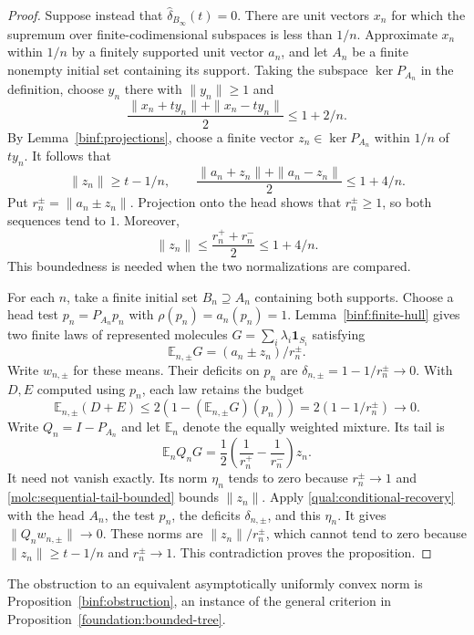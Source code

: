\begin{proof}
Suppose instead that $\widehat\delta_{B_\infty}(t)=0$. There are unit vectors $x_n$
for which the supremum over finite-codimensional subspaces is less than
$1/n$. Approximate $x_n$ within $1/n$ by a finitely supported unit vector
$a_n$, and let $A_n$ be a finite nonempty initial set containing its
support. Taking the subspace $\ker P_{A_n}$ in the definition, choose
$y_n$ there with $\|y_n\|\ge1$ and
\[
 \frac{\|x_n+ty_n\|+\|x_n-ty_n\|}{2}\le1+2/n.
\]
By Lemma~\ref{binf:projections}, choose a finite vector
$z_n\in\ker P_{A_n}$ within $1/n$ of $ty_n$. It follows that
\[
 \|z_n\|\ge t-1/n,\qquad
 \frac{\|a_n+z_n\|+\|a_n-z_n\|}{2}\le1+4/n.
\]
Put $r_n^\pm=\|a_n\pm z_n\|$. Projection onto the head shows that
$r_n^\pm\ge1$, so both sequences tend to $1$. Moreover,
\begin{equation}\label{molc:sequential-tail-bounded}
 \|z_n\|\le\frac{r_n^++r_n^-}{2}\le1+4/n.
\end{equation}
This boundedness is needed when the two normalizations are compared.

For each $n$, take a finite initial set $B_n\supseteq A_n$ containing
both supports. Choose a head test $p_n=P_{A_n}p_n$ with
$\rho(p_n)=a_n(p_n)=1$. Lemma~\ref{binf:finite-hull} gives two finite laws
of represented molecules $G=\sum_i\lambda_i\mathbf1_{S_i}$ satisfying
\[
 \mathbb E_{n,\pm}G=(a_n\pm z_n)/r_n^\pm.
\]
Write $w_{n,\pm}$ for these means. Their deficits on $p_n$ are
$\delta_{n,\pm}=1-1/r_n^\pm\to0$. With $D,E$ computed using $p_n$,
each law retains the budget
\begin{equation}\label{molc:sequential-deficits}
 \mathbb E_{n,\pm}(D+E)
 \le2\left(1-(\mathbb E_{n,\pm}G)(p_n)\right)
 =2(1-1/r_n^\pm)\longrightarrow0.
\end{equation}
Write $Q_n=I-P_{A_n}$ and let $\mathbb E_n$ denote the equally
weighted mixture. Its tail is
\begin{equation}\label{molc:unequal-normalization-tail}
 \mathbb E_n Q_nG
 =\frac12\left(\frac1{r_n^+}-\frac1{r_n^-}\right)z_n.
\end{equation}
It need not vanish exactly. Its norm $\eta_n$ tends to zero because
$r_n^\pm\to1$ and \eqref{molc:sequential-tail-bounded} bounds
$\|z_n\|$. Apply \eqref{qual:conditional-recovery} with the head
$A_n$, the test $p_n$, the deficits $\delta_{n,\pm}$, and this
$\eta_n$. It gives $\|Q_nw_{n,\pm}\|\to0$. These norms are
$\|z_n\|/r_n^\pm$, which cannot tend to zero because
$\|z_n\|\ge t-1/n$ and $r_n^\pm\to1$. This contradiction proves the
proposition.
\end{proof}

The obstruction to an equivalent asymptotically uniformly convex norm
is Proposition~\ref{binf:obstruction}, an instance of the general
criterion in Proposition~\ref{foundation:bounded-tree}.
